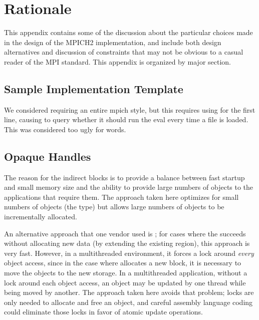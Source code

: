 \documentclass{article}
\begin{document}


\ifrationale
\section{Rationale}
\label{sec:rationale}

This appendix contains some of the discussion about the particular choices
made in the design of the MPICH2 implementation, and include both design
alternatives and discussion of constraints that may not be obvious to a casual
reader of the MPI standard.  This appendix is organized by major section.

\subsection{Sample Implementation Template}

We considered requiring an entire mpich style, but this requires using
 for the first line, causing  to query whether
it should run the eval every time a file is loaded.  This was
considered too ugly for words.

\subsection{Opaque Handles}
\label{sec:rationale-opaque-handles}

The reason for the indirect blocks is to provide a balance between fast
startup and small memory size and the ability to provide large numbers of
objects to the applications that require them.  The approach taken here
optimizes for small numbers of objects (the  type) but
allows large numbers of objects to be incrementally allocated.

An alternative approach that one vendor used is ; for cases
where the  succeeds without allocating new data (by extending
the existing region), this approach is very fast.  However, in a multithreaded
environment, it forces a lock around \emph{every} object access, since in the
case where  allocates a new block, it is necessary to move the
objects to the new storage.  In a multithreaded application, without a lock
around each object access, an object may be updated by one thread while being
moved by another.  The approach taken here avoids that problem; locks are only
needed to allocate and free an object, and careful assembly language coding
could eliminate those locks in favor of atomic update operations.
\end{document}
